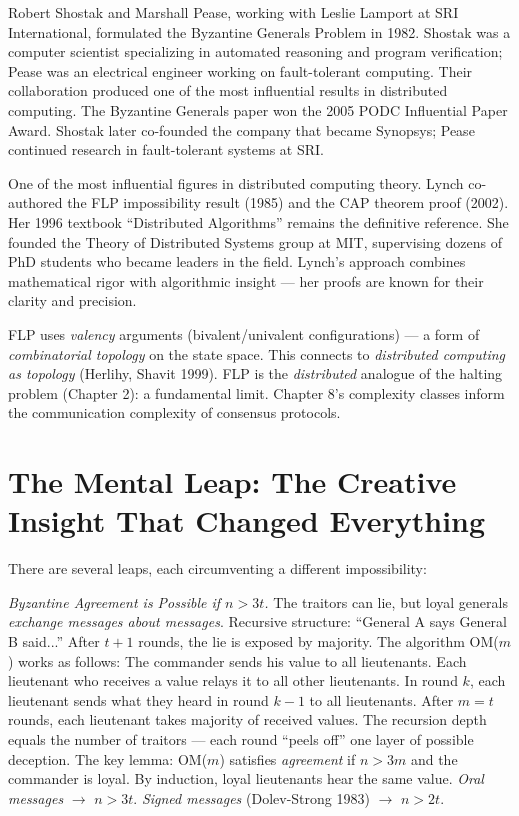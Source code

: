 Robert Shostak and Marshall Pease, working with Leslie Lamport at SRI International, formulated the Byzantine Generals Problem in 1982. Shostak was a computer scientist specializing in automated reasoning and program verification; Pease was an electrical engineer working on fault-tolerant computing. Their collaboration produced one of the most influential results in distributed computing. The Byzantine Generals paper won the 2005 PODC Influential Paper Award. Shostak later co-founded the company that became Synopsys; Pease continued research in fault-tolerant systems at SRI.

One of the most influential figures in distributed computing theory. Lynch co-authored the FLP impossibility result (1985) and the CAP theorem proof (2002). Her 1996 textbook ``Distributed Algorithms'' remains the definitive reference. She founded the Theory of Distributed Systems group at MIT, supervising dozens of PhD students who became leaders in the field. Lynch's approach combines mathematical rigor with algorithmic insight — her proofs are known for their clarity and precision.

FLP uses \emph{valency} arguments (bivalent/univalent configurations) — a form of \emph{combinatorial topology} on the state space. This connects to \emph{distributed computing as topology} (Herlihy, Shavit 1999). FLP is the \emph{distributed} analogue of the halting problem (Chapter 2): a fundamental limit. Chapter 8's complexity classes inform the communication complexity of consensus protocols.

\section{The Mental Leap: The Creative Insight That Changed Everything}
\label{sec:consensus:leap}

There are several leaps, each circumventing a different impossibility:

\emph{Byzantine Agreement is Possible if $n > 3t$.}
The traitors can lie, but loyal generals \emph{exchange messages about messages}. Recursive structure: ``General A says General B said...'' After $t+1$ rounds, the lie is exposed by majority. The algorithm OM($m$) works as follows: The commander sends his value to all lieutenants. Each lieutenant who receives a value relays it to all other lieutenants. In round $k$, each lieutenant sends what they heard in round $k-1$ to all lieutenants. After $m = t$ rounds, each lieutenant takes majority of received values. The recursion depth equals the number of traitors — each round ``peels off'' one layer of possible deception. The key lemma: OM($m$) satisfies \emph{agreement} if $n > 3m$ and the commander is loyal. By induction, loyal lieutenants hear the same value. \emph{Oral messages} $\to$ $n > 3t$. \emph{Signed messages} (Dolev-Strong 1983) $\to$ $n > 2t$.

